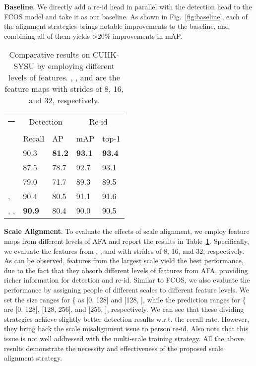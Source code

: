 \documentclass[final]{cvpr}
\makeatletter
\newcommand{\thickhline}{\noalign {\ifnum 0=`}\fi \hrule height 1pt
    \futurelet \reserved@a \@xhline
}
\makeatother
\begin{document}
\textbf{Baseline}.
We directly add a re-id head in parallel with the detection head to the FCOS model and take it as our baseline. As shown in Fig.~\ref{fig:baseline}, each of the alignment strategies brings notable improvements to the baseline, and combining all of them yields \textgreater20\% improvements in mAP.

\begin{table}[t]
\setlength{\abovecaptionskip}{1mm}
\centering
\begin{tabular}{p{1.7cm}|p{1.1cm}<{\centering}p{1.1cm}<{\centering}|p{1.1cm}<{\centering}p{1.1cm}<{\centering}}
\hline\thickhline
\rowcolor{mygray} 
  & \multicolumn{2}{c|}{Detection} & \multicolumn{2}{c}{Re-id}   \\ \cline{2-5} 
\rowcolor{mygray} 
\multirow{-2}{*}{Methods}  & Recall & AP  & mAP  & top-1  \\  \hline \hline     

  & 90.3    & \textbf{81.2} &\textbf{93.1} & \textbf{93.4}  \\
  & 87.5   & 78.7       & 92.7   & 93.1    \\ 
  & 79.0   & 71.7       & 89.3   & 89.5  \\
,   & 90.4  & 80.5       & 91.1 & 91.6 \\ 
, ,   & \textbf{90.9}  & 80.4       & 90.0 & 90.5 \\\hline
\end{tabular}
\caption{Comparative results on CUHK-SYSU by employing different levels of features. , , and  are the feature maps with strides of 8, 16, and 32, respectively. }
\label{tab:scale}
\end{table}

\textbf{Scale Alignment}. 
To evaluate the effects of scale alignment, we employ feature maps from different levels of AFA and report the results in Table~\ref{tab:scale}. Specifically, we evaluate the features from , , and  with strides of 8, 16, and 32, respectively. As can be observed, features from the largest scale  yield the best performance, due to the fact that they absorb different levels of features from AFA, providing richer information for detection and re-id. Similar to FCOS, we also evaluate the performance by assigning people of different scales to different feature levels. We set the size ranges for \{ as [0, 128] and [128, ], while the prediction ranges for \{ are [0, 128], [128, 256], and [256, ], respectively. We can see that these dividing strategies achieve slightly better detection results w.r.t. the recall rate. However, they bring back the scale misalignment issue to person re-id. Also note that this issue is not well addressed with the multi-scale training strategy. All the above results demonstrate the necessity and effectiveness of the proposed scale alignment strategy.
\end{document}
